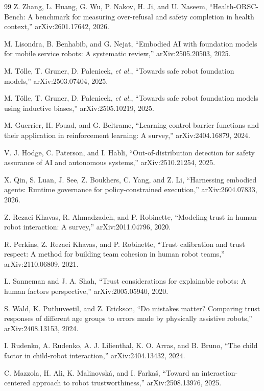 \documentclass[conference]{IEEEtran}
\begin{document}
\begin{thebibliography}{99}
Z. Zhang, L. Huang, G. Wu, P. Nakov, H. Ji, and U. Naseem, ``Health-ORSC-Bench: A benchmark for measuring over-refusal and safety completion in health context,'' arXiv:2601.17642, 2026.

M. Lisondra, B. Benhabib, and G. Nejat, ``Embodied AI with foundation models for mobile service robots: A systematic review,'' arXiv:2505.20503, 2025.

M. T{\"o}lle, T. Gruner, D. Palenicek, \emph{et al.}, ``Towards safe robot foundation models,'' arXiv:2503.07404, 2025.

M. T{\"o}lle, T. Gruner, D. Palenicek, \emph{et al.}, ``Towards safe robot foundation models using inductive biases,'' arXiv:2505.10219, 2025.

M. Guerrier, H. Fouad, and G. Beltrame, ``Learning control barrier functions and their application in reinforcement learning: A survey,'' arXiv:2404.16879, 2024.

V. J. Hodge, C. Paterson, and I. Habli, ``Out-of-distribution detection for safety assurance of AI and autonomous systems,'' arXiv:2510.21254, 2025.

X. Qin, S. Luan, J. See, Z. Boukhers, C. Yang, and Z. Li, ``Harnessing embodied agents: Runtime governance for policy-constrained execution,'' arXiv:2604.07833, 2026.

Z. Rezaei Khavas, R. Ahmadzadeh, and P. Robinette, ``Modeling trust in human-robot interaction: A survey,'' arXiv:2011.04796, 2020.

R. Perkins, Z. Rezaei Khavas, and P. Robinette, ``Trust calibration and trust respect: A method for building team cohesion in human robot teams,'' arXiv:2110.06809, 2021.

L. Sanneman and J. A. Shah, ``Trust considerations for explainable robots: A human factors perspective,'' arXiv:2005.05940, 2020.

S. Wald, K. Puthuveetil, and Z. Erickson, ``Do mistakes matter? Comparing trust responses of different age groups to errors made by physically assistive robots,'' arXiv:2408.13153, 2024.

I. Rudenko, A. Rudenko, A. J. Lilienthal, K. O. Arras, and B. Bruno, ``The child factor in child-robot interaction,'' arXiv:2404.13432, 2024.

C. Mazzola, H. Ali, K. Malinovsk{\'a}, and I. Farka{\v{s}}, ``Toward an interaction-centered approach to robot trustworthiness,'' arXiv:2508.13976, 2025.

\end{thebibliography}
\end{document}
